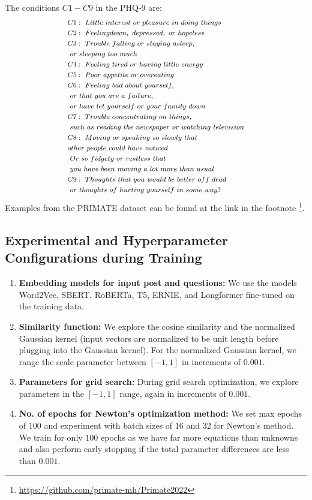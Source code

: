 \documentclass[letterpaper]{article} %
\begin{document}
The conditions $C1-C9$ in the PHQ-9 are:
\begin{equation*}
\footnotesize
\begin{split}
    & C1:~Little~interest~or~pleasure~in~doing~things \\
    & C2:~Feeling down,~depressed,~or~hopeless \\
    & C3:~Trouble~falling~or~staying~asleep,\\
    &~or~sleeping~too~much\\
    & C4:~Feeling~tired~or~having~little~energy\\
    & C5:~Poor~appetite~or~overeating\\
    & C6:~Feeling~bad~about~yourself,\\
    &~or~that~you~are~a~failure,\\
    &~or~have~let~yourself~or~your~family~down\\
    & C7:~Trouble~concentrating~on~things,\\
    &~such~as~reading~the~newspaper~or~watching~television\\
    & C8:~Moving~or~speaking~so~slowly~that\\
    &other~people~could~have~noticed\\
    &~Or~so~fidgety~or~restless~that\\
    &~you~have~been~moving~a~lot~more~than~usual\\
    & C9:~Thoughts~that~you~would~be~better~off~dead\\
    &~or~thoughts~of~hurting~yourself~in~some~way?
\end{split}
\end{equation*}
Examples from the PRIMATE dataset can be found at the link in the footnote \footnote{\url{https://github.com/primate-mh/Primate2022}}.
\subsection{Experimental and Hyperparameter Configurations during Training}
\begin{enumerate}
    \item \textbf{Embedding models for input post and questions: } We use the models Word2Vec, SBERT, RoBERTa, T5, ERNIE, and Longformer fine-tuned on the training data.
    \item \textbf{Similarity function: } We explore the cosine similarity and the normalized Gaussian kernel (input vectors are normalized to be unit length before plugging into the Gaussian kernel). For the normalized Gaussian kernel, we range the scale parameter between $[-1,1]$ in increments of $0.001$.
    \item \textbf{Parameters for grid search: } During grid search optimization, we explore parameters in the $[-1,1]$ range, again in increments of $0.001$.
    \item \textbf{No. of epochs for Newton's optimization method: } We set max epochs of $100$ and experiment with batch sizes of $16$ and $32$ for Newton's method. We train for only $100$ epochs as we have far more equations than unknowns and also perform early stopping if the total parameter differences are less than $0.001$.
\end{enumerate}
\end{document}
